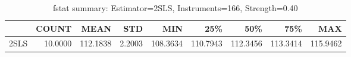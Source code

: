 \begin{table}[ht]
\centering
\caption{fstat summary: Estimator=2SLS, Instruments=166, Strength=0.40}
\begin{tabular}{lrrrrrrrr}
\toprule
 & COUNT & MEAN & STD & MIN & 25\% & 50\% & 75\% & MAX \\
\midrule
2SLS & 10.0000 & 112.1838 & 2.2003 & 108.3634 & 110.7943 & 112.3456 & 113.3414 & 115.9462 \\
\bottomrule
\end{tabular}
\end{table}
